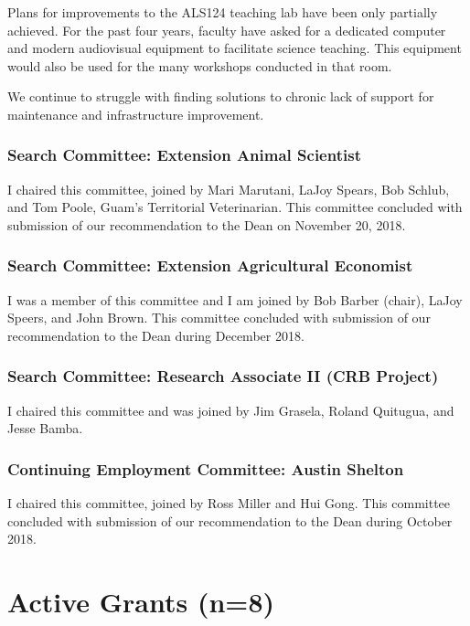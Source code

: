 Plans for improvements to the ALS124 teaching lab have been only partially
achieved. For the past four years, faculty have asked for a dedicated
computer and modern audiovisual equipment to facilitate science teaching. This equipment would also be used for the many workshops conducted in that room.

We continue to struggle with finding solutions to chronic lack of support for maintenance and infrastructure improvement.

\subsubsection{Search Committee: Extension Animal Scientist}

I chaired this committee, joined by Mari Marutani, LaJoy Spears,
Bob Schlub, and Tom Poole, Guam's Territorial Veterinarian. This committee concluded with submission of our recommendation to the Dean on November 20, 2018.

\subsubsection{Search Committee: Extension Agricultural Economist}

I was a member of this committee and I am joined by Bob Barber (chair),
LaJoy Speers, and John Brown. This committee concluded with submission of our recommendation to the Dean during December 2018.

\subsubsection{Search Committee: Research Associate II (CRB Project)}

I chaired this committee and was joined by Jim Grasela, Roland Quitugua,
and Jesse Bamba.

\subsubsection{Continuing Employment Committee: Austin Shelton}

I chaired this committee, joined by Ross Miller and Hui Gong. This committee concluded with submission of our recommendation to the Dean during October 2018. 

\newpage
\section{Active Grants (n=8)}
	
